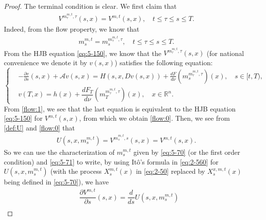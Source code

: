 \documentclass[11pt]{article}
\numberwithin{equation}{section}
\newcommand{\brn}{{\mathbb{R}^n}}
\newcommand{\1}{\mbox{1\hspace{-1mm}I}}
\begin{document}
\begin{proof}
The terminal condition is clear. We first claim that 
\begin{align}\label{flow:0}
    V^{m^{m,t}_\tau,\tau}(s,x) = V^{m,t}(s,x), \quad t\le \tau\le s\le T.
\end{align}
Indeed, from the flow property, we know that 
\begin{align}\label{flow:1}
    m^{m,t}_s=m^{m^{m,t}_\tau,\tau}_s,\quad t\le \tau\le s\le T.
\end{align}
From the HJB equation \eqref{eq:5-150}, we know that the $V^{m^{m,t}_\tau,\tau}(s,x)$ (for national convenience we denote it by $v(s,x)$) satisfies the following equation:
\begin{equation*}
    \left\{
    \begin{aligned}
        &-\frac{\partial v}{\partial s}(s,x)+\mathcal{A}v(s,x)=H\left(s,x,Dv(s,x)\right)+\frac{dF}{d\nu}\left(m^{m^{m,t}_\tau,\tau}_s\right)(x),\quad s\in[t,T),\\
        &v(T,x)=h(x)+\dfrac{dF_T}{d\nu}\left(m^{m^{m,t}_\tau,\tau}_T\right)(x),\quad x\in\brn.   
    \end{aligned}
    \right.
\end{equation*}
From \eqref{flow:1}, we see that the last equation is equivalent to the HJB equation \eqref{eq:5-150} for $V^{m,t}(s,x)$, from which we obtain \eqref{flow:0}. Then, we see from \eqref{def:U} and \eqref{flow:0} that 
\begin{align*}
    U\left(s,x,m^{m,t}_s\right) = V^{m^{m,t}_s,s}(s,x) = V^{m,t}(s,x).
\end{align*}
So we can use the characterization of $m^{m,t}_s$ given by \eqref{eq:5-70} (or the first order condition) and \eqref{eq:5-71} to write, by using It\^o's formula in \eqref{eq:2-560} for $U\left(s,x,m^{m,t}_s\right)$ (with the process $X^{m,t}_s(x)$ in \eqref{eq:2-50} replaced by $X^{x,m,t}_s(x)$ being defined in \eqref{eq:5-70}), we have
\begin{align*}
    &\dfrac{\partial V^{m,t}}{\partial s}(s,x)= \dfrac{d }{d s}U\left(s,x,m^{m,t}_s\right)\\

\end{align*}
\end{proof}
\end{document}
